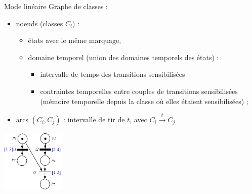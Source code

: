 \documentclass[compress]{beamer}
\begin{document}
\begin{frame}{Mode linéaire}
Graphe de classes :
\begin{itemize}
\item noeuds (classes $C_i$) :
	\begin{itemize}
	\item états avec le même marquage,
	\item domaine temporel (union des domaines temporels des états) :
		\begin{itemize}
		\item  intervalle de temps des transitions sensibilisées
		\item  contraintes temporelles entre couples de transitions sensibilisées (mémoire temporelle depuis la classe où elles étaient sensibilisées) ;
		\end{itemize}
	\end{itemize}
\item arcs $(C_i,C_j)$ : intervalle de tir de $t$, avec $C_i \stackrel{t}{\rightarrow}C_j$
\end{itemize}
\includegraphics[height=3cm]{rdp_temps_ch}
\end{frame}
\end{document}
